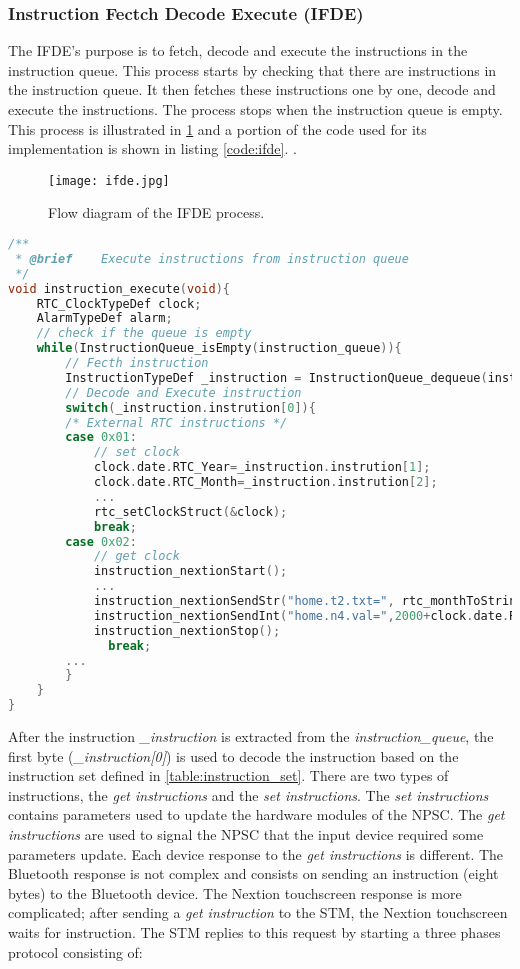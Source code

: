 \subsubsection{Instruction Fectch Decode Execute (IFDE)}\label{IFDE}
The IFDE's purpose is to fetch, decode and execute the instructions in the instruction queue. This process starts by checking that there are instructions in the instruction queue. It then fetches these instructions one by one, decode and execute the instructions. The process stops when the instruction queue is empty. This process is illustrated in \cref{fig:ifde} and a portion of the code used for its implementation is shown in listing \ref{code:ifde}. .
\begin{figure}[ht]
\centering
\texttt{[image: ifde.jpg]}
\caption{Flow diagram of the IFDE process.}
\label{fig:ifde}
\end{figure}
\begin{lstlisting}[language=C, caption=Instruction Fetch Decode Execute, label=code:ifde]
/**
 * @brief    Execute instructions from instruction queue
 */
void instruction_execute(void){
    RTC_ClockTypeDef clock;
    AlarmTypeDef alarm;
    // check if the queue is empty
    while(InstructionQueue_isEmpty(instruction_queue)){
        // Fecth instruction
        InstructionTypeDef _instruction = InstructionQueue_dequeue(instruction_queue);
        // Decode and Execute instruction
        switch(_instruction.instrution[0]){
        /* External RTC instructions */
        case 0x01:
            // set clock
            clock.date.RTC_Year=_instruction.instrution[1];
            clock.date.RTC_Month=_instruction.instrution[2];
            ...
            rtc_setClockStruct(&clock);
            break;
        case 0x02:
            // get clock
            instruction_nextionStart();
            ...            
            instruction_nextionSendStr("home.t2.txt=", rtc_monthToString(clock.date.RTC_Month) );
            instruction_nextionSendInt("home.n4.val=",2000+clock.date.RTC_Year);
            instruction_nextionStop();
              break;        
        ...
        }
    }
}
\end{lstlisting}
After the instruction \textit{\_instruction} is extracted from the \textit{instruction\_queue}, the first byte (\textit{\_instruction[0]}) is used to decode the instruction based on the instruction set defined in \cref{table:instruction_set}. There are two types of instructions, the \textit{get instructions} and the \textit{set instructions}. The \textit{set instructions} contains parameters used to update the hardware modules of the NPSC. The \textit{get instructions} are used to signal the NPSC that the input device required some parameters update. Each device response to the \textit{get instructions} is different. The Bluetooth response is not complex and consists on sending an instruction (eight bytes) to the Bluetooth device. The Nextion touchscreen response is more complicated; after sending a \textit{get instruction} to the STM, the Nextion touchscreen waits for instruction. The STM replies to this request by starting a three phases protocol consisting of:
